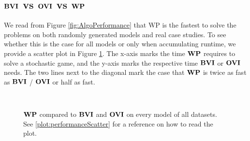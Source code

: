 \subsection{$\mathbf{BVI}$ vs $\mathbf{OVI}$ vs $\mathbf{WP}$}
We read from Figure \ref{fig:AlgoPerformance} that WP is the fastest to solve the problems on both randomly generated models and real case studies.
To see whether this is the case for all models or only when accumulating runtime, we provide a scatter plot in Figure \ref{fig:WPvsBVIvsOVI}.
The x-axis marks the time $\mathbf{WP}$ requires to solve a stochastic game, and the y-axis marks the respective time $\mathbf{BVI}$ or $\mathbf{OVI}$ needs.
The two lines next to the diagonal mark the case that $\mathbf{WP}$ is twice as fast as $\mathbf{BVI}$ / $\mathbf{OVI}$ or half as fast.

\begin{figure}[h!]
    \centering
    \
    \caption{$\mathbf{WP}$ compared to $\mathbf{BVI}$ and $\mathbf{OVI}$ on every model of all datasets. See \ref{plot:performanceScatter} for a reference on how to read the plot.}%
    \label{fig:WPvsBVIvsOVI}%
    \end{figure}
\FloatBarrier

